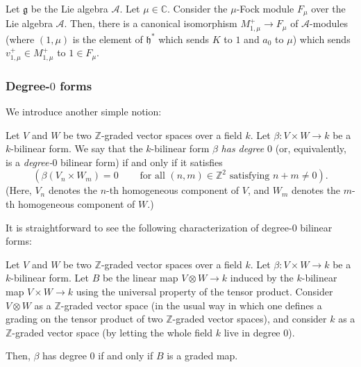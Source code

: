 \documentclass[etingof-lie.tex]{subfiles}
\begin{document}
\begin{proposition}
\label{prop.fockverma.A}Let $\mathfrak{g}$ be the Lie algebra $\mathcal{A}$.
Let $\mu\in\mathbb{C}$. Consider the $\mu$-Fock module $F_{\mu}$ over the Lie
algebra $\mathcal{A}$. Then, there is a canonical isomorphism $M_{1,\mu}%
^{+}\rightarrow F_{\mu}$ of $\mathcal{A}$-modules (where $\left(
1,\mu\right)  $ is the element of $\mathfrak{h}^{\ast}$ which sends $K$ to $1$
and $a_{0}$ to $\mu$) which sends $v_{1,\mu}^{+}\in M_{1,\mu}^{+}$ to $1\in
F_{\mu}$.
\end{proposition}

\subsubsection{Degree-\texorpdfstring{$0$}{0} forms}

We introduce another simple notion:

\begin{definition}
\label{def.deg0}Let $V$ and $W$ be two $\mathbb{Z}$-graded vector spaces over
a field $k$. Let $\beta:V\times W\rightarrow k$ be a $k$-bilinear form. We say
that the $k$-bilinear form $\beta$ \textit{has degree }$0$ (or, equivalently,
is a \textit{degree-}$0$ bilinear form) if and only if it satisfies%
\[
\left(  \beta\left(  V_{n}\times W_{m}\right)  =0\ \ \ \ \ \ \ \ \ \ \text{for
all }\left(  n,m\right)  \in\mathbb{Z}^{2}\text{ satisfying }n+m\neq0\right)
.
\]
(Here, $V_{n}$ denotes the $n$-th homogeneous component of $V$, and $W_{m}$
denotes the $m$-th homogeneous component of $W$.)
\end{definition}

It is straightforward to see the following characterization of degree-$0$
bilinear forms:

\begin{remark}
\label{rmk.deg0}Let $V$ and $W$ be two $\mathbb{Z}$-graded vector spaces over
a field $k$. Let $\beta:V\times W\rightarrow k$ be a $k$-bilinear form. Let
$B$ be the linear map $V\otimes W\rightarrow k$ induced by the $k$-bilinear
map $V\times W\rightarrow k$ using the universal property of the tensor
product. Consider $V\otimes W$ as a $\mathbb{Z}$-graded vector space (in the
usual way in which one defines a grading on the tensor product of two
$\mathbb{Z}$-graded vector spaces), and consider $k$ as a $\mathbb{Z}$-graded
vector space (by letting the whole field $k$ live in degree $0$).

Then, $\beta$ has degree $0$ if and only if $B$ is a graded map.
\end{remark}
\end{document}
